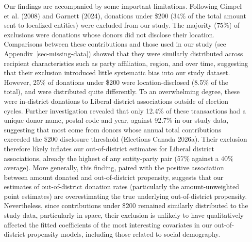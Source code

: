 \documentclass[
  letterpaper,
  DIV=11,
  numbers=noendperiod]{scrartcl}
\begin{document}
Our findings are accompanied by some important limitations. Following
Gimpel et al. (2008) and Garnett (2024), donations under \$200 (34\% of
the total amount sent to localized entities) were excluded from our
study. The majority (75\%) of exclusions were donations whose donors did
not disclose their location. Comparisons between these contributions and
those used in our study (see Appendix~\ref{sec-missing-data}) showed
that they were similarly distributed across recipient characteristics
such as party affiliation, region, and over time, suggesting that their
exclusion introduced little systematic bias into our study dataset.
However, 25\% of donations under \$200 were location-disclosed (8.5\% of
the total), and were distributed quite differently. To an overwhelming
degree, these were in-district donations to Liberal district
associations outside of election cycles. Further investigation revealed
that only 12.4\% of these transactions had a unique donor name, postal
code and year, against 92.7\% in our study data, suggesting that most
come from donors whose annual total contributions exceeded the \$200
disclosure threshold (Elections Canada 2026a). Their exclusion therefore
likely inflates our out-of-district estimates for Liberal district
associations, already the highest of any entity-party pair (57\% against
a 40\% average). More generally, this finding, paired with the positive
association between amount donated and out-of-district propensity,
suggests that our estimates of out-of-district donation rates
(particularly the amount-unweighted point estimates) are overestimating
the true underlying out-of-district propensity. Nevertheless, since
contributions under \$200 remained similarly distributed to the study
data, particularly in space, their exclusion is unlikely to have
qualitatively affected the fitted coefficients of the most interesting
covariates in our out-of-district propensity models, including those
related to social demography.
\end{document}

